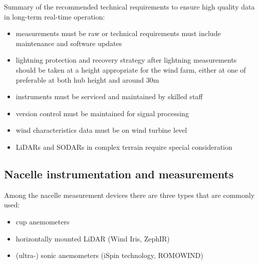 {\color{red}{Comment COM 21.08.2021: Is this the right place for this recommendation ?\\}Summary of the recommended technical requirements to ensure high quality data in long-term real-time operation:
\begin{itemize}
    \vspace{-0.2cm}\item measurements must be raw or technical requirements must include maintenance and software updates
    \vspace{-0.2cm}\item lightning protection and recovery strategy after lightning
measurements should be taken at a height appropriate for the wind farm, either at one of preferable at both hub height and around 30m
    \vspace{-0.2cm}\item instruments must be serviced and maintained by skilled staff
    \vspace{-0.2cm}\item version control must be maintained for signal processing
    \vspace{-0.2cm}\item wind characteristics data must be on wind turbine level
    \vspace{-0.2cm}\item LiDARs and SODARs in complex terrain require special consideration 
\end{itemize}
}

\subsection{Nacelle instrumentation and measurements{\color{blue}{ -- needs attention}}}\label{sec:Nacelle measurements}

Among the nacelle measurement devices there are three types that are commonly used:
\begin{itemize}
    \item cup anemometers
    \item horizontally mounted LiDAR (Wind Iris, ZephIR)
    \item (ultra-) sonic anemometers (iSpin technology, ROMOWIND)
\end{itemize}


